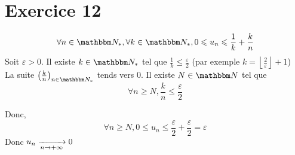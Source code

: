 \part{Exercice 12}

\[
\forall n \in \N_*, \forall k \in \N_*, 0 \le u_n \le \frac{1}{k} + \frac{k}{n}
\] 
Soit $\varepsilon >0$. Il existe $k \in \N_*$ tel que $\frac{1}{k} \le \frac{\varepsilon}{2}$ (par exemple $k = \left\lfloor \frac{2}{\varepsilon} \right\rfloor + 1$)\\
La suite $\left(\frac{k}{n}\right)_{n\in\N_*}$ tends vers 0. Il existe $N \in \N$ tel que \[
\forall n \ge N, \frac{k}{n} \le \frac{\varepsilon}{2}
\] 

Donc, \[
\forall n \ge N, 0 \le u_n \le \frac{\varepsilon}{2}+\frac{\varepsilon}{2} = \varepsilon
\] 
Donc $u_n \xrightarrow[n \to +\infty]{} 0$
